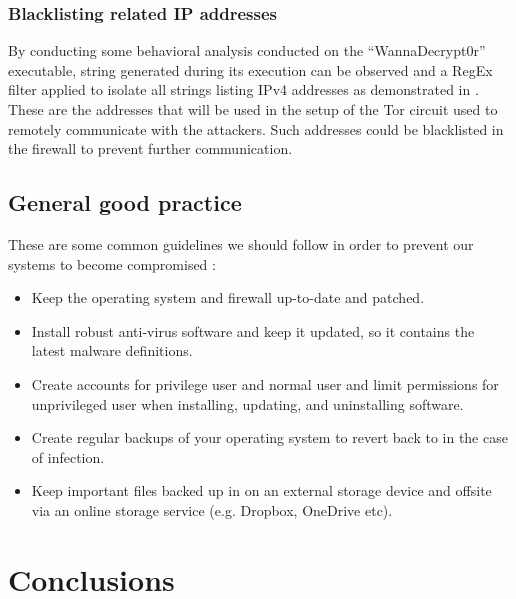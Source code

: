 \documentclass[10pt,a4paper]{article}
\begin{document}
\subsubsection{Blacklisting related IP addresses}
By conducting some behavioral analysis conducted on the ``WannaDecrypt0r'' executable, string generated during its execution can be observed and a RegEx filter applied to isolate all strings listing IPv4 addresses as demonstrated in \cite{wanacryFindIpAddr}. These are the addresses that will be used in the setup of the Tor circuit used to remotely communicate with the attackers. Such addresses could be blacklisted in the firewall to prevent further communication.

\subsection{General good practice}
These are some common guidelines we should follow in order to prevent our systems to become compromised \cite{genernalmitigation}: 
\begin{itemize}
\item Keep the operating system and firewall up-to-date and patched.
\item Install robust anti-virus software and keep it updated, so it contains the latest malware definitions.
\item Create accounts for privilege user and normal user and limit permissions for unprivileged user when installing, updating, and uninstalling software.
\item Create regular backups of your operating system to revert back to in the case of infection.
\item Keep important files backed up in on an external storage device and offsite via an online storage service (e.g. Dropbox, OneDrive etc).
\end{itemize}


\section{Conclusions}


\newpage
\end{document}
